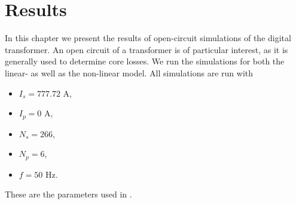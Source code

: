 \chapter{Results} \label{sec:results}
In this chapter we present the results of open-circuit simulations of the digital transformer.
An open circuit of a transformer is of particular interest, as it is generally used to determine core losses. 
We run the simulations for both the linear- as well as the non-linear model. 
All simulations are run with 
\begin{itemize}
    \item $I_s = 777.72$ A,
    \item $I_p = 0$ A,
    \item $N_s = 266$,
    \item $N_p = 6$,
    \item $f = 50$ Hz.
\end{itemize}
These are the parameters used in \cite{vanDijk2022}.

